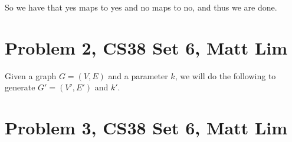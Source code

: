 \documentclass{article}
\begin{document}
So we have that yes maps to yes and no maps to no, and thus we are done.
\newpage

\section*{Problem 2, CS38 Set 6, Matt Lim}
Given a graph $G = (V,E)$ and a parameter $k$, we will do the following to
generate $G' = (V',E')$ and $k'$.
\newpage

\section*{Problem 3, CS38 Set 6, Matt Lim}
\newpage

\end{document}
